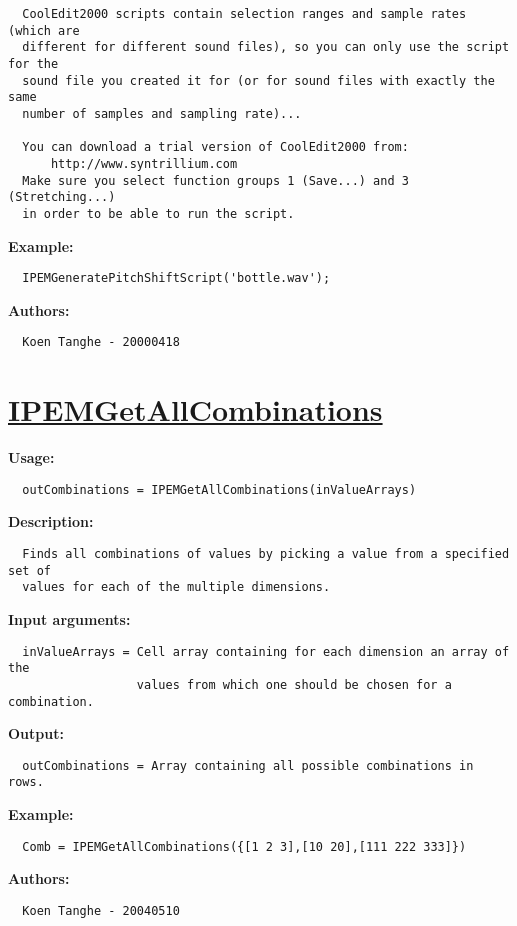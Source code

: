 \begin{verbatim}  CoolEdit2000 scripts contain selection ranges and sample rates (which are
  different for different sound files), so you can only use the script for the
  sound file you created it for (or for sound files with exactly the same
  number of samples and sampling rate)...

  You can download a trial version of CoolEdit2000 from:
      http://www.syntrillium.com
  Make sure you select function groups 1 (Save...) and 3 (Stretching...)
  in order to be able to run the script.

\end{verbatim}
\textbf{Example:}
\begin{verbatim}  IPEMGeneratePitchShiftScript('bottle.wav');

\end{verbatim}
\textbf{Authors:}
\begin{verbatim}  Koen Tanghe - 20000418
\end{verbatim}


\newpage
\section*{\hyperlink{Concepts:IPEMGetAllCombinations}{IPEMGetAllCombinations}}
\hypertarget{FuncRef:IPEMGetAllCombinations}{}

\textbf{Usage:}
\begin{verbatim}  outCombinations = IPEMGetAllCombinations(inValueArrays)

\end{verbatim}
\textbf{Description:}
\begin{verbatim}  Finds all combinations of values by picking a value from a specified set of
  values for each of the multiple dimensions.

\end{verbatim}
\textbf{Input arguments:}
\begin{verbatim}  inValueArrays = Cell array containing for each dimension an array of the 
                  values from which one should be chosen for a combination.

\end{verbatim}
\textbf{Output:}
\begin{verbatim}  outCombinations = Array containing all possible combinations in rows.

\end{verbatim}
\textbf{Example:}
\begin{verbatim}  Comb = IPEMGetAllCombinations({[1 2 3],[10 20],[111 222 333]})

\end{verbatim}
\textbf{Authors:}
\begin{verbatim}  Koen Tanghe - 20040510
\end{verbatim}


